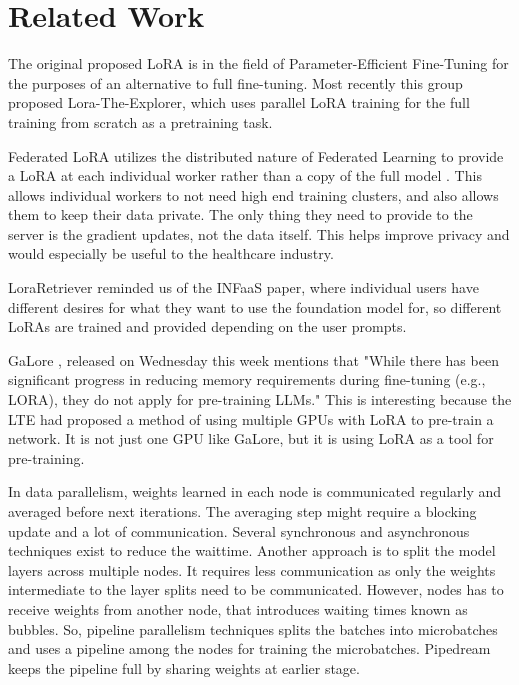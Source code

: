 \documentclass[pdftex,twocolumn,10pt,letterpaper]{article}
\begin{document}
\section{Related Work}
The original proposed LoRA \cite{Hu2021LoRA} is in the field of Parameter-Efficient Fine-Tuning for the purposes of an alternative to full fine-tuning. Most recently this group proposed Lora-The-Explorer, which uses parallel LoRA training for the full training from scratch as a pretraining task. \cite{huh2024training}

Federated LoRA utilizes the distributed nature of Federated Learning to provide a LoRA at each individual worker rather than a copy of the full model \cite{yi2023fedlora} \cite{Rieke2019FederatedLearning}. This allows individual workers to not need high end training clusters, and also allows them to keep their data private. The only thing they need to provide to the server is the gradient updates, not the data itself. This helps improve privacy and would especially be useful to the healthcare industry.

LoraRetriever \cite{zhao2024loraretriever} reminded us of the INFaaS paper, where individual users have different desires for what they want to use the foundation model for, so different LoRAs are trained and provided depending on the user prompts. 

GaLore \cite{zhao2024galore}, released on Wednesday this week mentions that "While there has been significant progress in reducing memory requirements during fine-tuning (e.g., LORA), they do not apply for pre-training LLMs." This is interesting because the LTE had proposed a method of using multiple GPUs with LoRA to pre-train a network. It is not just one GPU like GaLore, but it is using LoRA as a tool for pre-training.

In data parallelism, weights learned in each node is communicated regularly and averaged before next iterations. The averaging step might require a blocking update and a lot of communication. Several synchronous \cite{pytorch-ddp} and asynchronous techniques exist to reduce the waittime. Another approach is to split the model layers across multiple nodes. It requires less communication as only the weights intermediate to the layer splits need to be communicated. However, nodes has to receive weights from another node, that introduces waiting times known as bubbles. So, pipeline parallelism techniques splits the batches into microbatches and uses a pipeline among the nodes for training the microbatches. Pipedream \cite{pipedream} keeps the pipeline full by sharing weights at earlier stage.
\end{document}
